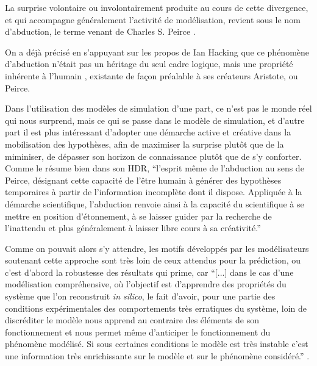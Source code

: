 La surprise volontaire ou involontairement produite au cours de cette divergence, et qui accompagne généralement l'activité de modélisation, revient sous le nom d'abduction, le terme venant de Charles S. Peirce \autocites{Besse2000, Banos2013, Phan2006, Livet2014}.

On a déjà précisé en s'appuyant sur les propos de Ian Hacking \autocites{Hacking1989,Hacking2003, Hacking2006} que ce phénomène d'abduction n'était pas un héritage du seul cadre logique, mais une propriété inhérente à l'humain , existante de façon préalable à ses créateurs Aristote, ou Peirce.

Dans l'utilisation des modèles de simulation d'une part, ce n'est pas le monde réel qui nous surprend, mais ce qui se passe dans le modèle de simulation, et d'autre part il est plus intéressant d'adopter une démarche active et créative dans la mobilisation des hypothèses, afin de maximiser la surprise plutôt que de la miminiser, de dépasser son horizon de connaissance plutôt que de s'y conforter. Comme le résume bien \textcite{Banos2013} dans son HDR, \enquote{l’esprit même de l’abduction au sens de Peirce, désignant cette capacité de l’être humain à générer des hypothèses temporaires à partir de l’information incomplète dont il dispose. Appliquée à la démarche scientifique, l’abduction renvoie ainsi à la capacité du scientifique à se mettre en position d’étonnement, à se laisser guider par la recherche de l’inattendu et plus généralement à laisser libre cours à sa créativité.}

Comme on pouvait alors s'y attendre, les motifs développés par les modélisateurs soutenant cette approche sont très loin de ceux attendus pour la prédiction, ou c'est d'abord la robustesse des résultats qui prime, car \enquote{[...] dans le cas d’une modélisation compréhensive, où l’objectif est d’apprendre des propriétés du système que l’on reconstruit \textit{in silico}, le fait d’avoir, pour une partie des conditions expérimentales des comportements très erratiques du système, loin de discréditer le modèle nous apprend au contraire des éléments de son fonctionnement et nous permet même d’anticiper le fonctionnement du phénomène modélisé. Si sous certaines conditions le modèle est très instable c’est une information très enrichissante sur le modèle et sur le phénomène considéré.} \autocite{Amblard2010}.


